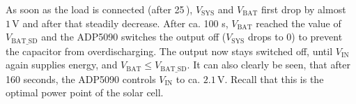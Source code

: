 As soon as the load is connected (after 25\,), $V_{\text{SYS}}$ and $V_{\text{BAT}}$ first drop by almost $1\,\text{V}$ and after that steadily decrease.
After ca. 100 s, $V_{\text{BAT}}$ reached the value of $V_{\text{BAT\_SD}}$ and the ADP5090 switches the output off ($V_{\text{SYS}}$ drops to 0) to prevent the capacitor from overdischarging.
The output now stays switched off, until $V_{\text{IN}}$ again supplies energy, and $V_{\text{BAT}} \le V_{\text{BAT\_SD}}$.
It can also clearly be seen, that after 160 seconds, the ADP5090 controls $V_{\text{IN}}$ to ca. $2.1\,\text{V}$. Recall that this is the optimal power point of the solar cell.
